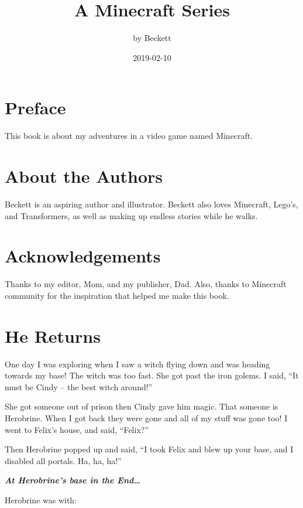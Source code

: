 \documentclass[12pt,oneside]{krantz}
\title{A Minecraft Series}
\author{by Beckett}
\date{2019-02-10}
\begin{document}
\maketitle

{
\setcounter{tocdepth}{1}
\tableofcontents
}
\hypertarget{preface}{%
\chapter*{Preface}\label{preface}}


This book is about my adventures in a video game named Minecraft.

\hypertarget{about-the-authors}{%
\chapter*{About the Authors}\label{about-the-authors}}


Beckett is an aspiring author and illustrator. Beckett also loves
Minecraft, Lego's, and Transformers, as well as making up endless
stories while he walks.

\hypertarget{acknowledgements}{%
\chapter*{Acknowledgements}\label{acknowledgements}}


Thanks to my editor, Mom, and my publisher, Dad. Also, thanks to
Minecraft community for the inspiration that helped me make this book.

\hypertarget{he-returns}{%
\chapter{He Returns}\label{he-returns}}

One day I was exploring when I saw a witch flying down and was heading
towards my base! The witch was too fast. She got past the iron golems. I
said, ``It must be Cindy -- the best witch around!''

She got someone out of prison then Cindy gave him magic. That someone is
Herobrine. When I got back they were gone and all of my stuff was gone
too! I went to Felix's house, and said, ``Felix?''

Then Herobrine popped up and said, ``I took Felix and blew up your base,
and I disabled all portals. Ha, ha, ha!''

\textbf{\emph{At Herobrine's base in the End\ldots{}}}

Herobrine was with:
\end{document}
